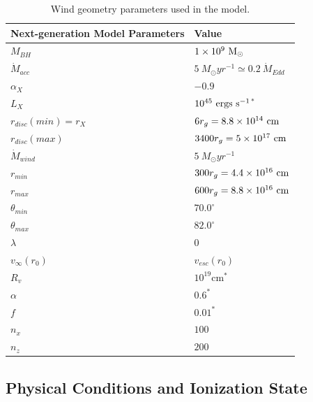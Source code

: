 \documentclass[useAMS,usenatbib]{mn2e_x}
\begin{document}
\begin{table}
\begin{tabular}{p{3cm}p{4cm}}
\hline Next-generation Model Parameters 	&	 Value \\ 
\hline \hline 
$M_{BH}$ 	 &	 $1\times 10^9~\rm{M_{\odot}}$ \\ 
$\dot{M}_{acc}$ 	 &	 $5~M_{\odot}yr^{-1} \simeq 0.2~\dot{M}_{Edd}$\\ 
$\alpha_X$ 	 &	 $-0.9$ \\ 
$L_{X} $ 	 &	 $10^{45}~\rm{ergs~s^{-1}}$$^*$ \\ 
$r_{disc}(min)=r_{X}$   &	 $6r_g=8.8\times10^{14}~{\rm cm}$ \\ 
$r_{disc}(max)$   &	 $3400r_g = 5\times10^{17}~{\rm cm}$ \\ 
$\dot{M}_{wind}$  &	 $5~M_{\odot}yr^{-1}$ \\ 
$r_{min}$ 	&	 $300r_{g} = 4.4\times10^{16}~{\rm cm}$\\ 
$r_{max}$ 	&	 $600r_{g} = 8.8\times10^{16}~{\rm cm}$ \\ 
$\theta_{min}$ 	&	 $70.0^{\circ}$ \\ 
$\theta_{max}$ 	&	 $82.0^{\circ}$ \\ 
$\lambda$ 	&	 $0$ \\ 
$v_{\infty}(r_0)$ 	&	 $v_{esc}(r_0)$ \\ 
$R_v$  	        &	 $10^{19}$cm$^*$ \\ 
$\alpha$ 	&	 $0.6^*$ \\
$f$ 	&	 $0.01^*$  \\
$n_x$ 	&	 $100$  \\
$n_z$ 	&	 $200$  \\
\hline 
\end{tabular}
\caption{Wind geometry parameters used in the model.}
\label{wind_param}
\end{table}



\subsection{Physical Conditions and Ionization State}
\end{document}
